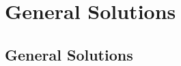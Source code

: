 \documentclass[11pt,
               aspectratio=169,
               hyperref={colorlinks}
               ]{beamer}
\begin{document}
	\section{General Solutions}
	
		\subsection{General Solutions}
	
			\begin{frame}[t, allowframebreaks]	
		

\end{frame}
\end{document}
